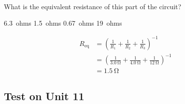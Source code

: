 \documentclass[]{exam}
\begin{document}
\begin{questions}
What is the equivalent resistance of this part of the circuit?

\begin{randomizechoices}
    \choice \SI{6.3}{ohms}
    \correctchoice \SI{1.5}{ohms}
    \choice \SI{0.67}{ohms}
    \choice \SI{19}{ohms}
\end{randomizechoices}

\begin{solution}
\begin{align*}
    R_\mathrm{eq} &= \left(\frac{1}{R_1} + \frac{1}{R_2} + \frac{1}{R_3}\right)^{-1} \\[1ex]
    &= \left(\frac{1}{\SI{3.0}{\ohm}} + \frac{1}{\SI{4.0}{\ohm}} + \frac{1}{\SI{12}{\ohm}}\right)^{-1} \\[1ex]
    &= \boxed{\SI{1.5}{\ohm}}
\end{align*}
\end{solution}
\end{questions}

\clearpage

\subsection*{Test on Unit 11}
\end{document}
